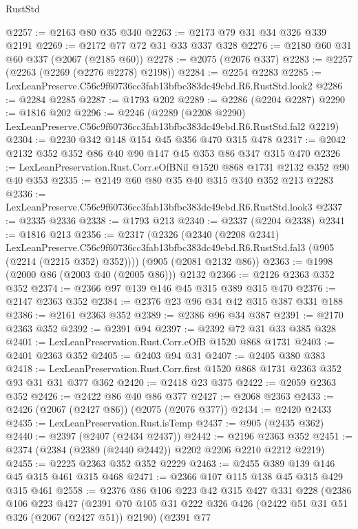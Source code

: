\begin{lexlean}{RustStd}
\begin{coremodule}
@2257 := @2163 @80 @35 @340
@2263 := @2173 @79 @31 @34 @326 @339 @2191
@2269 := @2172 @77 @72 @31 @33 @337 @328
@2276 := @2180 @60 @31 @60 @337 (@2067 (@2185 @60))
@2278 := @2075 (@2076 @337)
@2283 := @2257 (@2263 (@2269 (@2276 @2278) @2198))
@2284 := @2254 @2283
@2285 := LexLeanPreserve.C56c9f60736cc3fab13bfbc383dc49ebd.R6.RustStd.look2
@2286 := @2284 @2285
@2287 := @1793 @202
@2289 := @2286 (@2204 @2287)
@2290 := @1816 @202
@2296 := @2246
    (@2289 (@2208 @2290) LexLeanPreserve.C56c9f60736cc3fab13bfbc383dc49ebd.R6.RustStd.fal2 @2219)
@2304 := @2230 @342 @148 @154 @45 @356 @470 @315 @478
@2317 := @2042 @2132 @352 @352 @86 @40 @90 @147 @45 @353 @86 @347 @315 @470
@2326 := LexLeanPreservation.Rust.Corr.eOfBNil @1520 @868 @1731 @2132 @352 @90 @40 @353
@2335 := @2149 @60 @80 @35 @40 @315 @340 @352 @213 @2283
@2336 := LexLeanPreserve.C56c9f60736cc3fab13bfbc383dc49ebd.R6.RustStd.look3
@2337 := @2335 @2336
@2338 := @1793 @213
@2340 := @2337 (@2204 @2338)
@2341 := @1816 @213
@2356 := @2317
    (@2326
      (@2340
        (@2208 @2341)
        LexLeanPreserve.C56c9f60736cc3fab13bfbc383dc49ebd.R6.RustStd.fal3
        (@905 (@2214 (@2215 @352) @352))))
    (@905 (@2081 @2132 @86))
@2363 := @1998 (@2000 @86 (@2003 @40 (@2005 @86))) @2132
@2366 := @2126 @2363 @352 @352
@2374 := @2366 @97 @139 @146 @45 @315 @389 @315 @470
@2376 := @2147 @2363 @352
@2384 := @2376 @23 @96 @34 @42 @315 @387 @331 @188
@2386 := @2161 @2363 @352
@2389 := @2386 @96 @34 @387
@2391 := @2170 @2363 @352
@2392 := @2391 @94
@2397 := @2392 @72 @31 @33 @385 @328
@2401 := LexLeanPreservation.Rust.Corr.eOfB @1520 @868 @1731
@2403 := @2401 @2363 @352
@2405 := @2403 @94 @31
@2407 := @2405 @380 @383
@2418 := LexLeanPreservation.Rust.Corr.first @1520 @868 @1731 @2363 @352 @93 @31 @31 @377 @362
@2420 := @2418 @23 @375
@2422 := @2059 @2363 @352
@2426 := @2422 @86 @40 @86 @377
@2427 := @2068 @2363
@2433 := @2426 (@2067 (@2427 @86)) (@2075 (@2076 @377))
@2434 := @2420 @2433
@2435 := LexLeanPreservation.Rust.isTemp
@2437 := @905 (@2435 @362)
@2440 := @2397 (@2407 (@2434 @2437))
@2442 := @2196 @2363 @352
@2451 := @2374 (@2384 (@2389 (@2440 @2442)) @2202 @2206 @2210 @2212 @2219)
@2455 := @2225 @2363 @352 @352 @2229
@2463 := @2455 @389 @139 @146 @45 @315 @461 @315 @468
@2471 := @2366 @107 @115 @138 @45 @315 @429 @315 @461
@2558 := @2376
    @86
    @106
    @223
    @42
    @315
    @427
    @331
    @228
    (@2386
      @106
      @223
      @427
      (@2391
        @70
        @105
        @31
        @222
        @326
        @426
        (@2422 @51 @31 @51 @326 (@2067 (@2427 @51)) @2190)
        (@2391
          @77

\end{coremodule}
\end{lexlean}
